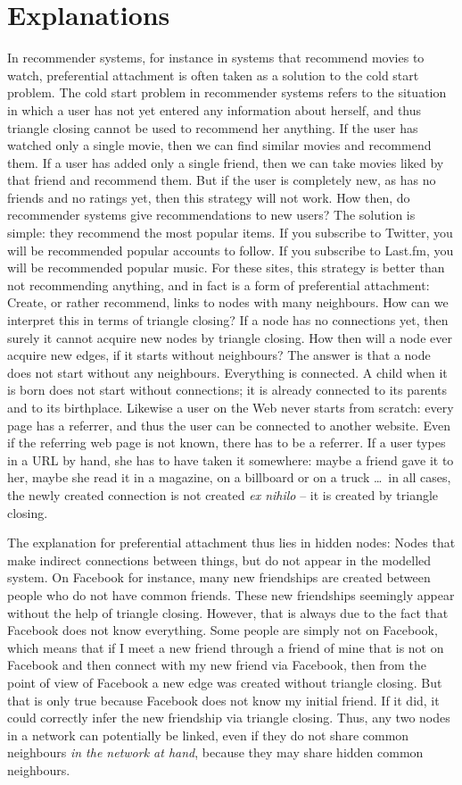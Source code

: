 \documentclass{acm_proc_article-sp}
\begin{document}
\section{Explanations}
In recommender systems, for instance in systems that recommend movies to
watch, preferential attachment is often taken as a solution to the cold
start problem.  The cold start problem in recommender systems refers to
the situation in which a user has not yet entered any information about
herself, and thus triangle closing cannot be used to recommend her
anything.  If the user has watched only a single movie, then we can find
similar movies and recommend them.  If a user has added only a single
friend, then we can take movies liked by that friend and recommend them.
But if the user is completely new, as has no friends and no ratings yet,
then this strategy will not work.  How then, do recommender systems give
recommendations to new users?  The solution is simple: they recommend
the most popular items.  If you subscribe to Twitter, you will be
recommended popular accounts to follow.  If you subscribe to Last.fm,
you will be recommended popular music.  For these sites, this strategy
is better than not recommending anything, and in fact is a form of
preferential attachment: Create, or rather recommend, links to nodes
with many neighbours.  How can we interpret this in terms of triangle
closing?  If a node has no connections yet, then surely it cannot
acquire new nodes by triangle closing.  How then will a node ever
acquire new edges, if it starts without neighbours?  The answer is that
a node does not start without any neighbours.  Everything is connected.
A child when it is born does not start without connections; it is
already connected to its parents and to its birthplace.  Likewise a
user on the Web never starts from scratch: every page has a referrer,
and thus the user can be connected to another website.  Even if the
referring web page is not known, there has to be a referrer.  If a user
types in a URL by hand, she has to have taken it somewhere: maybe a
friend gave it to her, maybe she read it
in a magazine, on a billboard or on a truck \ldots\ in all cases, the
newly created connection is not created \emph{ex nihilo} -- it is created
by triangle closing.

The explanation for preferential attachment thus lies in hidden nodes:
Nodes that make indirect connections between things, but do not appear
in the modelled system.  On Facebook for instance, many new
friendships are created between people who do not have common friends.
These new friendships seemingly appear without the help of triangle
closing.  However, that is always due to the fact that Facebook does not know
everything.  Some people are simply not on Facebook, which means that if
I meet a new friend through a friend of mine that is not on Facebook and
then connect with my new friend via Facebook, then from the point of
view of Facebook a new edge was created without triangle closing.  But
that is only true because Facebook does not know my initial friend.  If
it did, it could correctly infer the new friendship via triangle
closing.  Thus, any two nodes in a network can potentially be linked,
even if they do not share common neighbours \emph{in the network at
  hand}, because they may share hidden common neighbours.  
\end{document}
